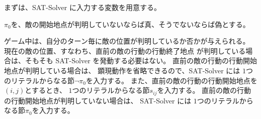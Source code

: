 まずは、SAT-Solver に入力する変数を用意する。

\begin{nota} \label{nota:pi}
 $\pi_0$を、敵の開始地点が判明していないならば真、そうでないならば偽とする。
\end{nota}

\begin{rem}
 ゲーム中は、自分のターン毎に敵の位置が判明しているか否かが与えられる。
 現在の敵の位置、すなわち、直前の敵の行動の行動終了地点
 が判明している場合は、そもそも
 SAT-Solver を発動する必要はない。
 直前の敵の行動の行動開始地点が判明している場合は、
 顕現動作を省略できるので、SAT-Solver には
 $1$つのリテラルからなる節$\lnot \pi_0$を入力する。
 また、直前の敵の行動の行動開始地点を$(i, j)$とするとき、
 $1$つのリテラルからなる節$s_{ij}$を入力する。
 直前の敵の行動の行動開始地点が判明していない場合は、
 SAT-Solver には
 $1$つのリテラルからなる節$\pi_0$を入力する。
\end{rem}

